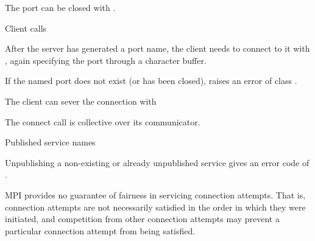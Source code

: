 
The port can be closed with 
.

 {Client calls}

After the server has generated a port name, the client 
needs to connect to it with
, again specifying the port through a character buffer.


If the named port does not exist (or has been closed),
 raises an error of class .

The client can sever the connection with

The connect call is collective over its communicator.

 {Published service names}



Unpublishing a non-existing or already unpublished service gives an
error code of .


MPI provides no guarantee of fairness in servicing connection
attempts. That is, connection attempts are not necessarily satisfied
in the order in which they were initiated, and competition from other
connection attempts may prevent a particular connection attempt from
being satisfied.


